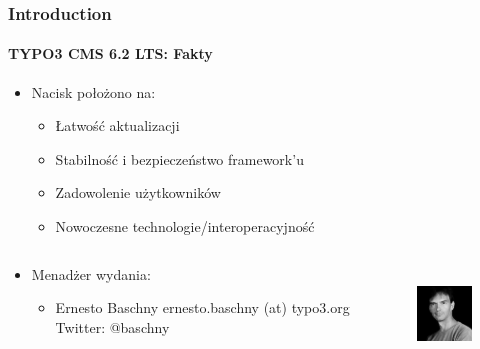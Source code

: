 \begin{frame}[fragile]
	\frametitle{Introduction}
	\framesubtitle{TYPO3 CMS 6.2 LTS: Fakty}

	\begin{itemize}
		\item Nacisk położono na:
			\begin{itemize}
				\item Łatwość aktualizacji
				\item Stabilność i bezpieczeństwo framework'u
				\item Zadowolenie użytkowników
				\item Nowoczesne technologie/interoperacyjność
			\end{itemize}
	\end{itemize}

	\begin{columns}[T]
		\begin{column}{.5\textwidth}
			\begin{itemize}
				\item Menadżer wydania:
				\begin{itemize}
					\item Ernesto Baschny\newline
						ernesto.baschny (at) typo3.org\newline
						Twitter: @baschny
				\end{itemize}
			\end{itemize}
		\end{column}

		\begin{column}{.5\textwidth}
			\begin{figure}
				\includegraphics[width=2.6cm,height=2.6cm]{Images/Introduction/ErnestoBaschny.jpg}
			\end{figure}
		\end{column}

	\end{columns}

\end{frame}


